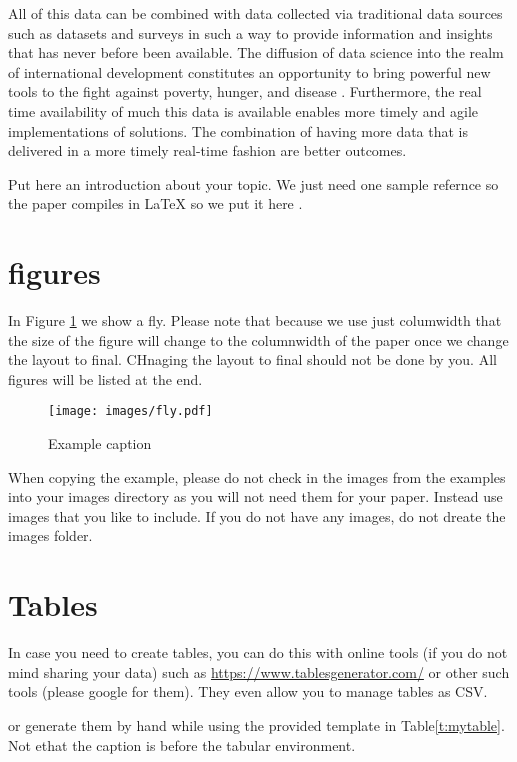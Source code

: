 \documentclass[sigconf]{acmart}
\begin{document}
All of this data can be combined with data collected via traditional data sources such as datasets and surveys in such a way to provide information and insights that has never before been available. The diffusion of data science into the realm of international development constitutes an opportunity to bring powerful new tools to the fight against poverty, hunger, and disease \cite{GloPls}. Furthermore, the real time availability of much this data is available enables more timely and agile implementations of solutions. The combination of having more data that is delivered in a more timely real-time fashion are better outcomes.

Put here an introduction about your topic. 
We just need one sample refernce so the paper compiles in LaTeX so we
put it here \cite{editor00}.

\section{figures}

In Figure \ref{f:fly} we show a fly. Please note that because we use
just columwidth that the size of the figure will change to the
columnwidth of the paper once we change the layout to final. CHnaging
the layout to final should not be done by you. All figures will be
listed at the end.

\begin{figure}[!ht]
  \centering\texttt{[image: images/fly.pdf]}
  \caption{Example caption}\label{f:fly}
\end{figure}

When copying the example, please do not check in the images from the
examples into your images directory as you will not need them for your
paper. Instead use images that you like to include. If you do not have
any images, do not dreate the images folder.

\section{Tables}

In case you need to create tables, you can do this with online tools
(if you do not mind sharing your data) such as
\url{https://www.tablesgenerator.com/} or other such tools (please
google for them). They even allow you to manage tables as CSV.

or generate them by hand while using the provided template in Table\ref{t:mytable}. Not ethat
the caption is before the tabular environment.
\end{document}
